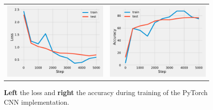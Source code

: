 \documentclass{article}
\newcommand\·{\ensuremath{\cdot}}
\newcommand\…{\ensuremath{\dots}}
\newcommand{\⇔}{\ensuremath{\iff}}
\newcommand{\⇐}{\ensuremath{\impliedby}}
\newcommand{\⇒}{\ensuremath{\implies}}
\newcommand\1{\ensuremath{\mathds{1}}}
\newcommand\ℝ{\ensuremath{\mathds{R}}}
\begin{document}
\begin{figure}
  \begin{tabularx}{\linewidth}{XX}
    \includegraphics[width=\linewidth]{assignment_1/code/conv_loss.pdf} &
    \includegraphics[width=\linewidth]{assignment_1/code/conv_accuracy.pdf}
  \end{tabularx}
  \caption{\textbf{Left} the loss and \textbf{right} the accuracy during training of the PyTorch CNN implementation.}
  \label{fig:pytorch_conv}
\end{figure}
\end{document}

